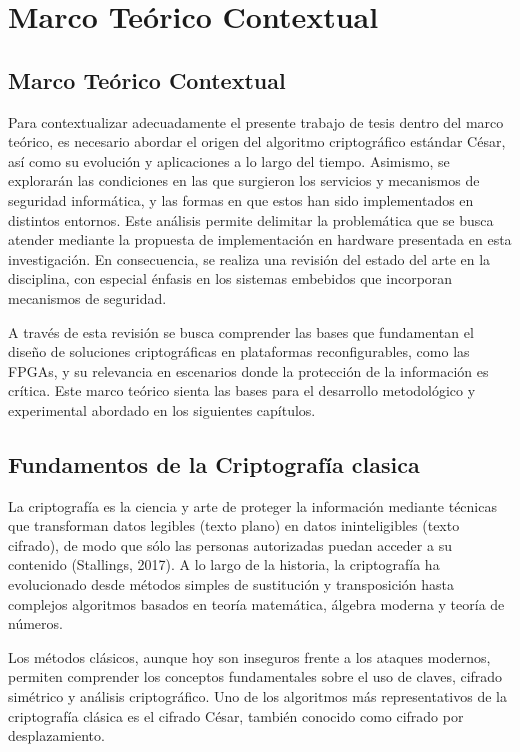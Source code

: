\chapter{Marco Teórico Contextual}

\section{Marco Teórico Contextual}
Para contextualizar adecuadamente el presente trabajo de tesis dentro del marco teórico, es necesario abordar el origen del algoritmo criptográfico estándar César, así como su evolución y aplicaciones a lo largo del tiempo. Asimismo, se explorarán las condiciones en las que surgieron los servicios y mecanismos de seguridad informática, y las formas en que estos han sido implementados en distintos entornos. Este análisis permite delimitar la problemática que se busca atender mediante la propuesta de implementación en hardware presentada en esta investigación. En consecuencia, se realiza una revisión del estado del arte en la disciplina, con especial énfasis en los sistemas embebidos que incorporan mecanismos de seguridad.

A través de esta revisión se busca comprender las bases que fundamentan el diseño de soluciones criptográficas en plataformas reconfigurables, como las FPGAs, y su relevancia en escenarios donde la protección de la información es crítica. Este marco teórico sienta las bases para el desarrollo metodológico y experimental abordado en los siguientes capítulos.

\section{Fundamentos de la Criptografía clasica}
La criptografía es la ciencia y arte de proteger la información mediante técnicas que transforman datos legibles (texto plano) en datos ininteligibles (texto cifrado), de modo que sólo las personas autorizadas puedan acceder a su contenido (Stallings, 2017). A lo largo de la historia, la criptografía ha evolucionado desde métodos simples de sustitución y transposición hasta complejos algoritmos basados en teoría matemática, álgebra moderna y teoría de números.

Los métodos clásicos, aunque hoy son inseguros frente a los ataques modernos, permiten comprender los conceptos fundamentales sobre el uso de claves, cifrado simétrico y análisis criptográfico. Uno de los algoritmos más representativos de la criptografía clásica es el cifrado César, también conocido como cifrado por desplazamiento.

